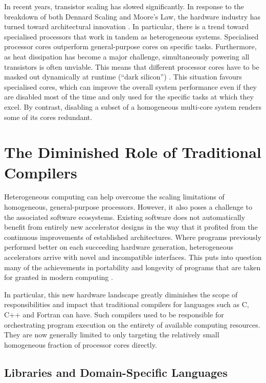     \pagebreak
    In recent years, transistor scaling has slowed significantly.
    In response to the breakdown of both Dennard Scaling and Moore's Law, the
    hardware industry has turned toward architectural innovation
    \citep{7878935}.
    In particular, there is a trend toward specialised processors that work
    in tandem as heterogeneous systems.
    Specialised processor cores outperform general-purpose cores on
    specific tasks.
    Furthermore, as heat dissipation has become a major challenge,
    simultaneously powering all transistors is often unviable.
    This means that different processor cores have to be masked out
    dynamically at runtime (``dark silicon'') \citep{6307773}.
    This situation favours specialised cores, which can improve the overall
    system performance even if they are disabled most of the time and only used
    for the specific tasks at which they excel.
    By contrast, disabling a subset of a homogeneous multi-core system renders
    some of its cores redundant.

\section{The Diminished Role of Traditional Compilers}

    Heterogeneous computing can help overcome the scaling limitations of
    homogeneous, general-purpose processors.
    However, it also poses a challenge to the associated software ecosystems.
    Existing software does not automatically benefit from entirely new
    accelerator designs in the way that it profited from the continuous
    improvements of established architectures.
    Where programs previously performed better on each succeeding hardware
    generation, heterogeneous accelerators arrive with novel and incompatible
    interfaces.
    This puts into question many of the achievements in portability and
    longevity of programs that are taken for granted in modern computing
    \citep{8719512}.

    In particular, this new hardware landscape greatly diminishes the scope of
    responsibilities and impact that traditional compilers for languages such as
    C, C++ and Fortran can have.
    Such compilers used to be responsible for orchestrating
    program execution on the entirety of available computing resources.
    They are now generally limited to only targeting the relatively small
    homogeneous fraction of processor cores directly.

\subsection{Libraries and Domain-Specific Languages}

